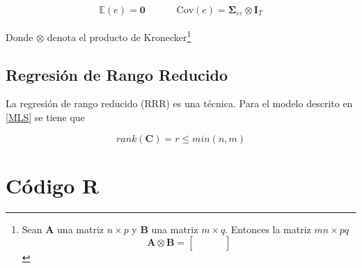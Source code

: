 \documentclass[12pt, twoside]{book}\usepackage[]{graphicx}\usepackage[]{color}
\let\bold\boldsymbol
\let\bf\mathbf
\numberwithin{equation}{section}
\numberwithin{theorem}{section}
\numberwithin{teorema}{section}
\numberwithin{defi}{section}
\numberwithin{prop}{section}
\numberwithin{defi}{section}
\theoremstyle{plain}
\begin{document}
\begin{align}
\mathbb{E}(e) = \bf{0} && && \text{Cov}(e) = \bold{\Sigma}_{\varepsilon\varepsilon} \otimes \bf{I}_{T}
\end{align}


Donde $\otimes$ denota el producto de Kronecker\footnote{Sean $\bf{A}$ una matriz $n\times p$ y $\bf{B}$ una matriz $m\times q$. Entonces la matriz $mn\times pq$
\begin{equation}
\bf{A}\otimes \bf{B} = \left[
\begin{array}{cccc}
& & & \\
& & & \\ 
& & & 
\end{array}\right]
\end{equation}
}
\subsection{Regresión de Rango Reducido}
La regresión de rango reducido (RRR) es una técnica. Para el modelo descrito en  \eqref{MLS} se tiene que 

\begin{equation}
rank(\bf{C}) = r\leq min(n,m)
\end{equation}


\endgroup
\begingroup
\renewcommand\thesection{B}
\titleformat{\section}[display]
{\normalfont\huge\bfseries}{}{20pt}{\huge}
\section{Código R}
\end{document}
